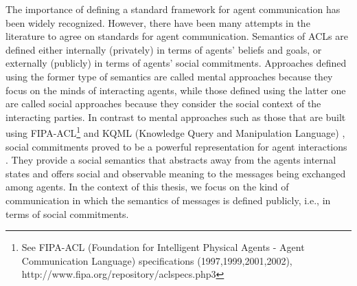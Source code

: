 The importance of defining a standard framework for agent communication has been widely recognized. However, there have been many attempts in the literature to agree on standards for agent communication. Semantics of ACLs are defined either internally (privately) in terms of agents' beliefs and goals, or externally (publicly) in terms of agents' social commitments.
Approaches defined using the former type of semantics are called mental
approaches because they focus on the minds of interacting agents, while those defined using the latter one are called social approaches because they consider the social context of the interacting parties. In contrast to mental approaches such as those that are built using FIPA-ACL\footnote{See FIPA-ACL (Foundation for Intelligent Physical Agents - Agent Communication Language) specifications (1997,1999,2001,2002), http://www.fipa.org/repository/aclspecs.php3} and KQML (Knowledge Query and Manipulation Language) \cite{Finin1994}, social commitments proved to be a powerful representation for agent interactions \cite{Bentahar2010,Mallya2007,Yolum2004}. They provide a social semantics that abstracts away from the agents internal states and offers social and observable meaning to the messages being exchanged among agents. In the context of this thesis, we focus on the kind of communication in which the semantics of messages is defined publicly, i.e., in terms of social commitments.



